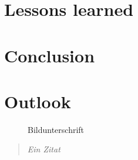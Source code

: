 \section{Lessons learned}\label{lessons_learned}
\section{Conclusion}\label{conclusion}
\section{Outlook}\label{outlook}	
	
		\begin{figure}[htbp]
			\centering
			\caption[xxx]{Bildunterschrift}
			\label{xxx}
		\end{figure}
		
		
		\begin{quote}
			\textit{Ein Zitat}
		\end{quote}


				\autocite[20]{}


\newpage






